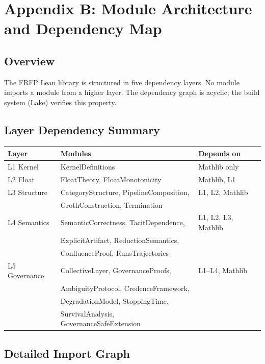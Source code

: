 \section{Appendix B: Module Architecture and Dependency Map}
\label{app:architecture}

\subsection*{Overview}

The FRFP Lean library is structured in five dependency layers. No module imports
a module from a higher layer. The dependency graph is acyclic; the build system
(Lake) verifies this property.

\subsection*{Layer Dependency Summary}

\begin{center}
\begin{tabular}{lll}
\toprule
Layer & Modules & Depends on \\
\midrule
L1 Kernel & KernelDefinitions & Mathlib only \\
L2 Float & FloatTheory, FloatMonotonicity & Mathlib, L1 \\
L3 Structure & CategoryStructure, PipelineComposition, & L1, L2, Mathlib \\
 & GrothConstruction, Termination & \\
L4 Semantics & SemanticCorrectness, TacitDependence, & L1, L2, L3, Mathlib \\
 & ExplicitArtifact, ReductionSemantics, & \\
 & ConfluenceProof, RunsTrajectories & \\
L5 Governance & CollectiveLayer, GovernanceProofs, & L1--L4, Mathlib \\
 & AmbiguityProtocol, CredenceFramework, & \\
 & DegradationModel, StoppingTime, & \\
 & SurvivalAnalysis, GovernanceSafeExtension & \\
\bottomrule
\end{tabular}
\end{center}

\subsection*{Detailed Import Graph}

